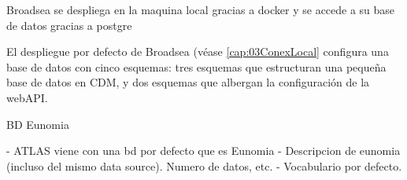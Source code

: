 Broadsea se despliega en la maquina local gracias a docker y se accede a su base de datos gracias a postgre

El despliegue por defecto de Broadsea (véase \ref{cap:03ConexLocal} configura una base de datos con cinco esquemas: tres esquemas que estructuran una pequeña base de datos en CDM, y dos esquemas que albergan la configuración de la webAPI. 


BD Eunomia

- ATLAS viene con una bd por defecto que es Eunomia
- Descripcion de eunomia (incluso del mismo data source). Numero de datos, etc.
- Vocabulario por defecto.


